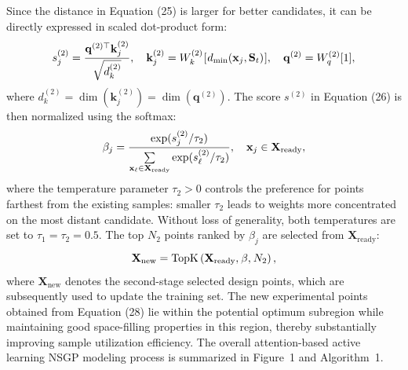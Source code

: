 \documentclass[]{interact}
\theoremstyle{plain}%
\theoremstyle{definition}
\theoremstyle{remark}
\begin{document}
Since the distance in Equation (25) is larger for better candidates, it can be directly expressed in scaled dot-product form:
\begin{equation}
	s_j^{(2)} = \frac{{{{\bf{q}}^{(2) \top }}{\bf{k}}_j^{(2)}}}{{\sqrt {d_k^{(2)}} }},\quad {\bf{k}}_j^{(2)} = W_k^{(2)}{\mkern 1mu} [{\mkern 1mu} {d_{\min }}({{\bf{x}}_j},{{\bf{S}}_t}){\mkern 1mu} ],\quad {{\bf{q}}^{(2)}} = W_q^{(2)}[1],
\end{equation}
where $d_{k}^{(2)} = \dim(\mathbf{k}_{j}^{(2)}) = \dim(\mathbf{q}^{(2)})$. The score $s^{(2)}$ in Equation (26) is then normalized using the softmax:
\begin{equation}
	{\beta _j} = \frac{{\exp (s_j^{(2)}/{\tau _2})}}{{\sum\limits_{{{\bf{x}}_\ell } \in {{\bf{X}}_{{\rm{ready}}}}} {\exp } (s_\ell ^{(2)}/{\tau _2})}},\quad {{\bf{x}}_j} \in {{\bf{X}}_{{\rm{ready}}}},
\end{equation}
where the temperature parameter $\tau_{2} > 0$ controls the preference for points farthest from the existing samples: smaller $\tau_{2}$ leads to weights more concentrated on the most distant candidate. Without loss of generality, both temperatures are set to $\tau_{1} = \tau_{2} = 0.5$. The top $N_{2}$ points ranked by $\beta_{j}$ are selected from $\mathbf{X}_{\mathrm{ready}}$:
\begin{equation}
	{{\bf{X}}_{{\rm{new}}}} = {\rm{TopK}}\left( {{{\bf{X}}_{{\rm{ready}}}},{\mkern 1mu} \beta ,{\mkern 1mu} {N_2}} \right),
\end{equation}
where $\mathbf{X}_{\mathrm{new}}$ denotes the second-stage selected design points, which are subsequently used to update the training set. The new experimental points obtained from Equation (28) lie within the potential optimum subregion while maintaining good space-filling properties in this region, thereby substantially improving sample utilization efficiency. The overall attention-based active learning NSGP modeling process is summarized in Figure~1 and Algorithm~1.
\end{document}
